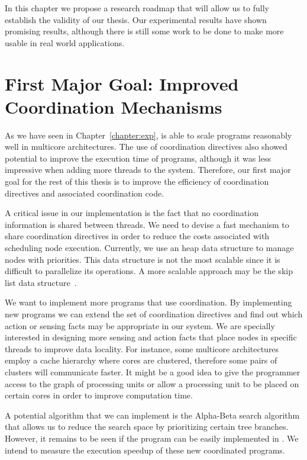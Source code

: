 
In this chapter we propose a research roadmap that will allow us to fully establish the validity of our thesis.
Our experimental results have shown promising results, although there is still some work to be done to make
\lang more usable in real world applications.

\section{First Major Goal: Improved Coordination Mechanisms}

As we have seen in Chapter~\ref{chapter:exp}, \lang is able to scale programs reasonably well
in multicore architectures.
The use of coordination directives also showed potential to improve the execution time of programs, although it was less impressive
when adding more threads to the system. Therefore, our first major goal for the rest of this thesis is to improve the
efficiency of coordination directives and associated coordination code.

A critical issue in our implementation is the fact that no coordination information is shared between threads. We need to devise a fast mechanism to share coordination directives
in order to reduce the costs associated with scheduling node execution.
Currently, we use an heap data structure to manage nodes with priorities. This data structure is not the most scalable since it is difficult to parallelize its operations.
A more scalable approach may be the skip list data structure~\cite{Sundell:2005:FLC:1073765.1073770}.

We want to implement more programs that use coordination. By implementing new programs we can
extend the set of coordination directives and find out which action or sensing facts may be
appropriate in our system. We are specially interested in designing more sensing and action
facts that place nodes in specific threads to improve data locality.
For instance, some multicore architectures employ a cache hierarchy where cores are clustered,
therefore some pairs of clusters will communicate faster. It might be a good idea to give the programmer
access to the graph of processing units or allow a processing unit to be placed on certain
cores in order to improve computation time.

A potential algorithm that we can implement is the Alpha-Beta search algorithm
that allows us to reduce the search space by prioritizing certain tree branches. However, it remains to be
seen if the program can be easily implemented in \lang.
We intend to measure the execution speedup of these new coordinated programs.

